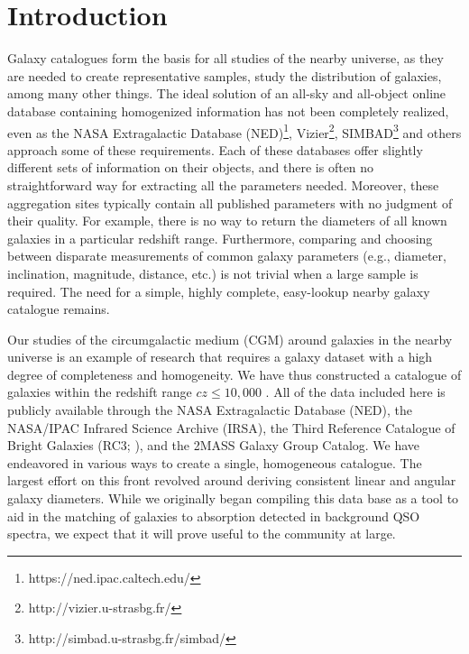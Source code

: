 \cleardoublepage



\section{Introduction}

Galaxy catalogues form the basis for all studies of the nearby universe, as they are needed to create representative samples, study the distribution of galaxies, among many other things. The ideal solution of an all-sky and all-object online database containing homogenized information has not been completely realized, even as the NASA Extragalactic Database (NED)\footnote{https://ned.ipac.caltech.edu/}, Vizier\footnote{http://vizier.u-strasbg.fr/}, SIMBAD\footnote{http://simbad.u-strasbg.fr/simbad/} and others approach some of these requirements. Each of these databases offer slightly different sets of information on their objects, and there is often no straightforward way for extracting all the parameters needed. Moreover, these aggregation sites typically contain all published parameters with no judgment of their quality. For example, there is no way to return the diameters of all known galaxies in a particular redshift range. Furthermore, comparing and choosing between disparate measurements of common galaxy parameters (e.g., diameter, inclination, magnitude, distance, etc.) is not trivial when a large sample is required. The need for a simple, highly complete, easy-lookup nearby galaxy catalogue remains.

Our studies of the circumgalactic medium (CGM) around galaxies in the nearby universe is an example of research that requires a galaxy dataset with a high degree of completeness and homogeneity. We have thus constructed a catalogue of galaxies within the redshift range $cz \leq 10,000$ \kms. All of the data included here is publicly available through the NASA Extragalactic Database (NED), the NASA/IPAC Infrared Science Archive (IRSA), the Third Reference Catalogue of Bright Galaxies (RC3; \citealt{RC3}), and the \cite{tully2015} 2MASS Galaxy Group Catalog. We have endeavored in various ways to create a single, homogeneous catalogue. The largest effort on this front revolved around deriving consistent linear and angular galaxy diameters. While we originally began compiling this data base as a tool to aid in the matching of galaxies to absorption detected in background QSO spectra,  we expect that it will prove useful to the community at large. 

